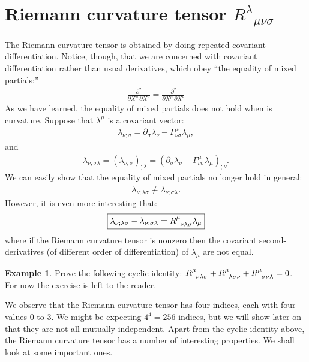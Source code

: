 \documentclass{book}
\theoremstyle{definition}
\newtheorem{exmp}{Example}[section]
\begin{document}
\section{Riemann curvature tensor $R^{\lambda}_{\text{ }\mu\nu\sigma}$}
The Riemann curvature tensor is obtained by doing repeated covariant differentiation. Notice, though, that we are concerned with covariant differentiation rather than usual derivatives, which obey ``the equality of mixed partials:''
\begin{align*}
\frac{\partial^2}{\partial X^\mu\,\partial X^\nu} = \frac{\partial^2}{\partial X^\mu\, \partial X^\nu}
\end{align*}
As we have learned, the equality of mixed partials does not hold when is curvature. Suppose that $\lambda^\mu$ is a covariant vector:
\begin{align*}
\lambda_{\nu;\sigma} = \partial_\sigma \lambda_\nu - \Gamma^\mu_{\nu\sigma}\lambda_\mu,
\end{align*}
and 
\begin{align*}
\lambda_{\nu;\sigma\lambda} = \left(\lambda_{\nu;\sigma} \right)_{;\lambda} = \left(\partial_\sigma \lambda_\nu - \Gamma^\mu_{\nu\sigma}\lambda_\mu  \right)_{;\nu}.
\end{align*}
We can easily show that the equality of mixed partials no longer hold in general:
\begin{align*}
\lambda_{\nu;\lambda\sigma} \neq \lambda_{\nu;\sigma\lambda}.
\end{align*}
However, it is even more interesting that:
\begin{align*}
\boxed{\lambda_{\nu;\lambda\sigma} - \lambda_{\nu;\sigma\lambda} = \tensor{R}{^{\mu}_{\nu\lambda\sigma}}\lambda_\mu}
\end{align*}
where if the Riemann curvature tensor is nonzero then the covariant second-derivatives (of different order of differentiation) of $\lambda_\mu$ are not equal. \\

\begin{exmp}
	Prove the following cyclic identity:	$\tensor{R}{^{\mu}_{\nu\lambda\sigma}} + \tensor{R}{^{\mu}_{\lambda\sigma\nu}} + \tensor{R}{^{\mu}_{\sigma\nu\lambda}} = 0$.\\
	
	For now the exercise is left to the reader. 
\end{exmp}
We observe that the Riemann curvature tensor has four indices, each with four values 0 to 3. We might be expecting $4^4 = 256$ indices, but we will show later on that they are not all mutually independent. Apart from the cyclic identity above, the Riemann curvature tensor has a number of interesting properties. We shall look at some important ones.\\
\end{document}
